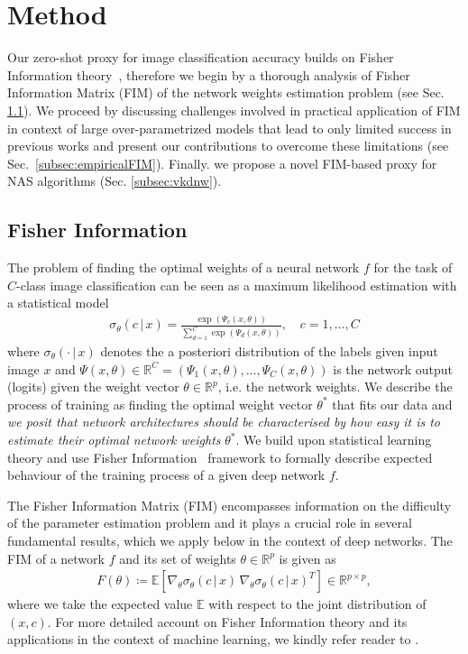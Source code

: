 \section{Method}
\label{sec:method}

Our zero-shot proxy for image classification accuracy builds on Fisher Information theory~\cite{ly2017tutorial}, therefore we begin by a thorough analysis of Fisher Information Matrix (FIM) of the network weights estimation problem (see Sec. \ref{subsec:fim}). We proceed by discussing challenges involved in practical application of FIM in context of large over-parametrized models that lead to only limited success in previous works and present our contributions to overcome these limitations (see Sec.~\ref{subsec:empiricalFIM}). Finally. we propose a novel FIM-based proxy for NAS algorithms (Sec. \ref{subsec:vkdnw}).

\subsection{Fisher Information}
\label{subsec:fim}

The problem of finding the optimal weights of a neural network $f$ for the task of $C$-class image classification can be seen as a maximum likelihood estimation with a statistical model
\begin{align}
    \sigma_\theta(c\,|\,x)=\frac{\exp\left({\Psi_c(x, \theta)}\right)}{\sum_{d=1}^C\exp\left({\Psi_d(x, \theta)}\right)}, \quad c=1,\dots, C
\end{align}
where $\sigma_\theta(\cdot\,|\,x)$ denotes the a posteriori distribution of the labels given input image $x$ and $\Psi(x,\theta)\in\mathbb{R}^C=\left( \Psi_1(x,\theta),\dots ,\Psi_C(x,\theta)\right)$ is the network output (logits) given the weight vector $\theta\in\mathbb{R}^p$, i.e. the network weights. 
We describe the process of training as finding the optimal weight vector $\theta^*$ that fits our data and \textit{we posit that network architectures should be characterised by how easy it is to estimate their optimal network weights} $\theta^*$. 
We build upon statistical learning theory and use Fisher Information~\cite{ly2017tutorial} framework to formally describe expected behaviour of the training process of a given deep network $f$.

The Fisher Information Matrix (FIM) encompasses information on the difficulty of the parameter estimation problem and it plays a crucial role in several fundamental results, which we apply below in the context of deep networks. The FIM of a network $f$ and its set of weights  $\theta\in\mathbb{R}^p$ is given as
\begin{align}
\label{eq:fim}
F(\theta)\coloneq\mathbb{E}\left[\nabla_{\theta}\sigma_\theta(c\,|\,x)\,\nabla_{\theta}\sigma_\theta(c\,|\,x)^T\right]\in\mathbb{R}^{p\times p},
\end{align}
where we take the expected value $\mathbb{E}$ with respect to the joint distribution of $(x,c)$. For more detailed account on Fisher Information theory and its applications in the context of  machine learning, we kindly refer reader to \cite{karakida2019universal, martens2020new, lee2022masking, pennington2018spectrum, park2019adaptive}.

